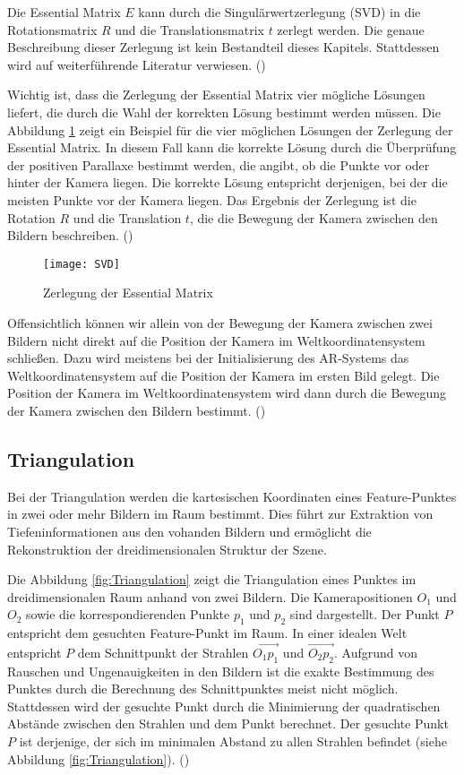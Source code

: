 Die Essential Matrix \( E \) kann durch die Singulärwertzerlegung (SVD) in die Rotationsmatrix \( R \) und die Translationsmatrix \( t \) zerlegt werden. Die genaue Beschreibung dieser Zerlegung ist kein Bestandteil dieses Kapitels. Stattdessen wird auf weiterführende Literatur verwiesen. (\cite{gao2021vSLAM, tsai1984svd})

Wichtig ist, dass die Zerlegung der Essential Matrix vier mögliche Lösungen liefert, die durch die Wahl der korrekten Lösung bestimmt werden müssen. Die Abbildung \ref{fig:SVD} zeigt ein Beispiel für die vier möglichen Lösungen der Zerlegung der Essential Matrix. In diesem Fall kann die korrekte Lösung durch die Überprüfung der positiven Parallaxe bestimmt werden, die angibt, ob die Punkte vor oder hinter der Kamera liegen. Die korrekte Lösung entspricht derjenigen, bei der die meisten Punkte vor der Kamera liegen. Das Ergebnis der Zerlegung ist die Rotation \( R \) und die Translation \( t \), die die Bewegung der Kamera zwischen den Bildern beschreiben. (\cite{gao2021vSLAM})

\begin{figure}
    \centering
    \texttt{[image: SVD]}
    \caption{Zerlegung der Essential Matrix\label{fig:SVD}}\par
\end{figure}

Offensichtlich können wir allein von der Bewegung der Kamera zwischen zwei Bildern nicht direkt auf die Position der Kamera im Weltkoordinatensystem schließen. Dazu wird meistens bei der Initialisierung des AR-Systems das Weltkoordinatensystem auf die Position der Kamera im ersten Bild gelegt. Die Position der Kamera im Weltkoordinatensystem wird dann durch die Bewegung der Kamera zwischen den Bildern bestimmt. (\cite{gao2021vSLAM})

\subsection{Triangulation}

Bei der Triangulation werden die kartesischen Koordinaten eines Feature-Punktes in zwei oder mehr Bildern im Raum bestimmt. Dies führt zur Extraktion von Tiefeninformationen aus den vohanden Bildern und ermöglicht die Rekonstruktion der dreidimensionalen Struktur der Szene. 

Die Abbildung \ref{fig:Triangulation} zeigt die Triangulation eines Punktes im dreidimensionalen Raum anhand von zwei Bildern. Die Kamerapositionen \( O_1 \) und \( O_2 \) sowie die korrespondierenden Punkte \( p_1 \) und \( p_2 \) sind dargestellt. Der Punkt \( P \) entspricht dem gesuchten Feature-Punkt im Raum. In einer idealen Welt entspricht \( P \) dem Schnittpunkt der Strahlen \( \overrightarrow{O_1p_1} \) und \( \overrightarrow{O_2p_2} \). Aufgrund von Rauschen und Ungenauigkeiten in den Bildern ist die exakte Bestimmung des Punktes durch die Berechnung des Schnittpunktes meist nicht möglich. Stattdessen wird der gesuchte Punkt durch die Minimierung der quadratischen Abstände zwischen den Strahlen und dem Punkt berechnet. Der gesuchte Punkt \( P \) ist derjenige, der sich im minimalen Abstand zu allen Strahlen befindet (siehe Abbildung \ref{fig:Triangulation}). (\cite{gao2021vSLAM})

